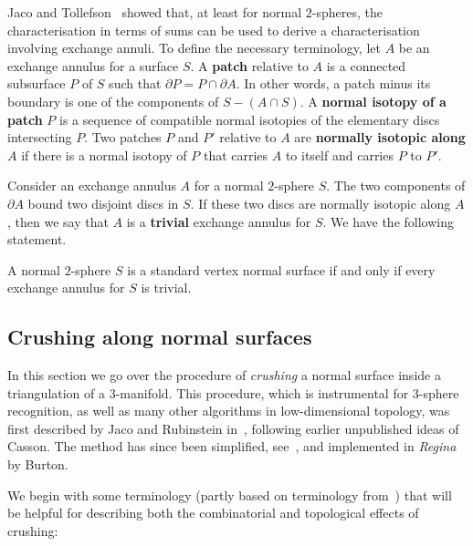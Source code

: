 \documentclass[a4paper,UKenglish,cleveref, autoref, thm-restate]{lipics-v2021}
\begin{document}
Jaco and Tollefson~\cite{jaco1995algorithms} showed that, at least for normal $2$-spheres,
the characterisation in terms of sums can be used to derive a characterisation involving exchange annuli.
To define the necessary terminology, let $A$ be an exchange annulus for a surface $S$.
A \textbf{patch} relative to $A$ is a connected subsurface $P$ of $S$ such that $\partial P = P\cap\partial A$.
In other words, a patch minus its boundary is one of the components of $S-(A\cap S)$.
A \textbf{normal isotopy of a patch} $P$ is a sequence of compatible normal isotopies of the elementary discs intersecting $P$.
Two patches $P$ and $P'$ relative to $A$ are \textbf{normally isotopic along} $A$ if there is
a normal isotopy of $P$ that carries $A$ to itself and carries $P$ to $P'$.

Consider an exchange annulus $A$ for a normal $2$-sphere $S$.
The two components of $\partial A$ bound two disjoint discs in $S$.
If these two discs are normally isotopic along $A$, then we say that $A$ is a \textbf{trivial} exchange annulus for $S$. We have the following statement.

\begin{theorem}\label{thm:jacoTollefsonExchange}
A normal $2$-sphere $S$ is a standard vertex normal surface if and only if every exchange annulus for $S$ is trivial.
\end{theorem}

\subsection{Crushing along normal surfaces}\label{ssec:intermediateCell}

In this section we go over the procedure of {\em crushing} a normal surface inside a triangulation of a $3$-manifold.
This procedure, which is instrumental for $3$-sphere recognition, as well as many other algorithms
in low-dimensional topology, was first described by Jaco and Rubinstein in~\cite{jaco2003efficient}, following earlier unpublished ideas of Casson.
The method has since been simplified, see~\cite{burton2014crushing}, and implemented in {\em Regina}~\cite{Regina} by Burton.

We begin with some terminology (partly based on terminology from~{\cite[p.~91]{jaco2003efficient}}) that will be helpful for describing both the combinatorial and topological effects of crushing:
\end{document}
